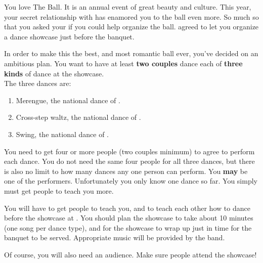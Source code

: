 \documentclass[green]{NeptuneBall}
\begin{document}
\name{\gDance{}}

You love The \cExExKing{} Ball. It is an annual event of great beauty and culture. This year, your secret relationship with \cDiplomat{} has enamored you to the ball even more. So much so that you asked your \cKing{\parent} if you could help organize the ball. \cKing{} agreed to let you organize a dance showcase just before the banquet.

In order to make this the best, and most romantic ball ever, you've decided on an ambitious plan.  You want to have at least {\bf two couples} dance each of {\bf three  kinds} of dance at the showcase.\\

The three dances are:
\begin{enumerate}
\item Merengue, the national dance of \pAtlantis{}.
\item Cross-step waltz, the national dance of \pPacifica{}.
\item Swing, the national dance of \pAmerica{}.
\end{enumerate}

You need to get four or more people (two couples minimum) to agree to perform each dance. You do not need the same four people for all three dances, but there is also no limit to how many dances any one person can perform. You {\bf may} be one of the performers. Unfortunately you only know one dance so far. You simply must get people to teach you more.

You will have to get people to teach you, and to teach each other how to dance before the showcase at {\bf \cTOneFifty{}}. You should plan the showcase to take about 10 minutes (one song per dance type), and for the showcase to wrap up just in time for the banquet to be served. Appropriate music will be provided by the band.

Of course, you will also need an audience. Make sure people attend the showcase!
\end{document}
